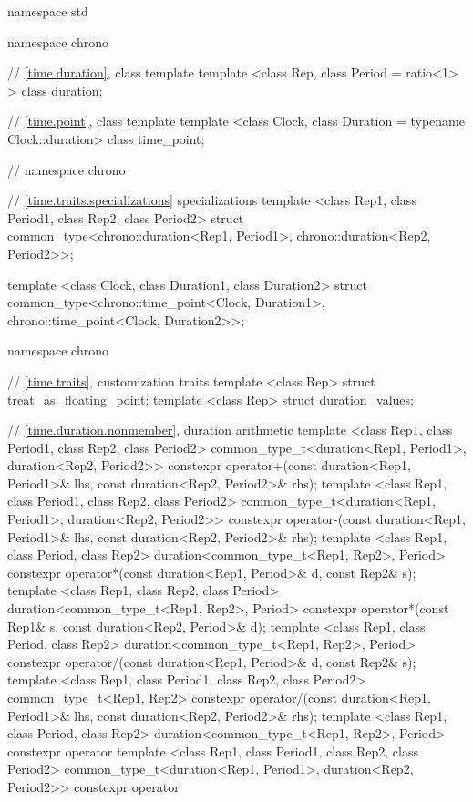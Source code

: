 \begin{codeblock}
namespace std {
namespace chrono {

// \ref{time.duration}, class template 
template <class Rep, class Period = ratio<1> > class duration;

// \ref{time.point}, class template 
template <class Clock, class Duration = typename Clock::duration> class time_point;

}  // namespace chrono

// \ref{time.traits.specializations}  specializations
template <class Rep1, class Period1, class Rep2, class Period2>
  struct common_type<chrono::duration<Rep1, Period1>, chrono::duration<Rep2, Period2>>;

template <class Clock, class Duration1, class Duration2>
  struct common_type<chrono::time_point<Clock, Duration1>, chrono::time_point<Clock, Duration2>>;

namespace chrono {

// \ref{time.traits}, customization traits
template <class Rep> struct treat_as_floating_point;
template <class Rep> struct duration_values;

// \ref{time.duration.nonmember}, duration arithmetic
template <class Rep1, class Period1, class Rep2, class Period2>
  common_type_t<duration<Rep1, Period1>, duration<Rep2, Period2>>
  constexpr operator+(const duration<Rep1, Period1>& lhs, const duration<Rep2, Period2>& rhs);
template <class Rep1, class Period1, class Rep2, class Period2>
  common_type_t<duration<Rep1, Period1>, duration<Rep2, Period2>>
  constexpr operator-(const duration<Rep1, Period1>& lhs, const duration<Rep2, Period2>& rhs);
template <class Rep1, class Period, class Rep2>
  duration<common_type_t<Rep1, Rep2>, Period>
  constexpr operator*(const duration<Rep1, Period>& d, const Rep2& s);
template <class Rep1, class Rep2, class Period>
  duration<common_type_t<Rep1, Rep2>, Period>
  constexpr operator*(const Rep1& s, const duration<Rep2, Period>& d);
template <class Rep1, class Period, class Rep2>
  duration<common_type_t<Rep1, Rep2>, Period>
  constexpr operator/(const duration<Rep1, Period>& d, const Rep2& s);
template <class Rep1, class Period1, class Rep2, class Period2>
  common_type_t<Rep1, Rep2>
  constexpr operator/(const duration<Rep1, Period1>& lhs, const duration<Rep2, Period2>& rhs);
template <class Rep1, class Period, class Rep2>
  duration<common_type_t<Rep1, Rep2>, Period>
  constexpr operator%
template <class Rep1, class Period1, class Rep2, class Period2>
  common_type_t<duration<Rep1, Period1>, duration<Rep2, Period2>>
  constexpr operator%

}}
\end{codeblock}
